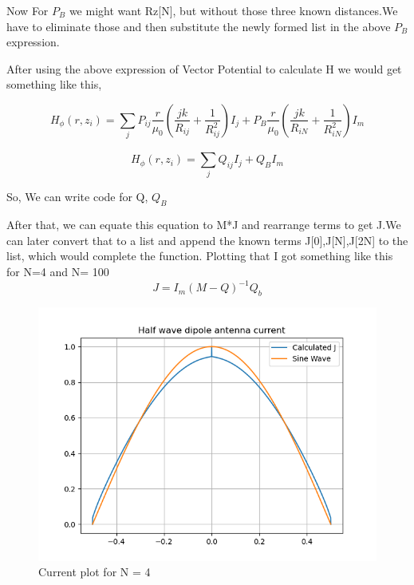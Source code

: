 \documentclass[12pt, a4paper]{report}
\begin{document}
Now For $P_B$ we might want Rz[N], but without those three known distances.We have to eliminate those and then substitute the newly formed list in the above $P_B$ expression.

 \vspace{1cm}

After using the above expression of Vector Potential to calculate H we would get something like this,


 \begin{equation*}
H_\phi(r,z_i) = \sum_{j} ^{} P_{ij} \frac{r}{\mu_0}(  \frac{jk}{R_{ij}} + \frac{1}{R_{ij}^2} )I_j + P_B\frac{r}{\mu_0}(  \frac{jk}{R_{iN}} + \frac{1}{R_{iN}^2} )I_m
 \end{equation*}
 
 
 \begin{equation*}
H_\phi(r,z_i) = \sum_{j} ^{} Q_{ij} I_j + Q_BI_m
 \end{equation*}
 
 So, We can write code for Q, $Q_B$
 
 After that, we can equate this equation to M*J and rearrange terms to get J.We can later convert that to a list and append the known terms J[0],J[N],J[2N] to the list, which would complete the function. Plotting that I got something like this for N=4 and N= 100
 \begin{equation*}
 J = I_m(M-Q)^{-1}Q_b
 \end{equation*}
 \newline

\begin{figure}[!tbh]
   	\centering
   	\includegraphics[scale=0.7]{Q5.png}
	\caption{Current plot for N = 4}
 \end{figure} 
 
\end{document}
